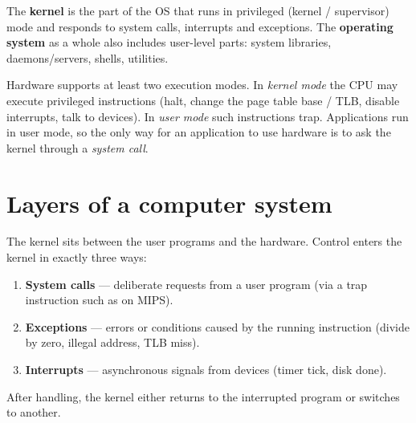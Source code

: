 \begin{definition}[Kernel]
The \textbf{kernel} is the part of the OS that runs in privileged (kernel / supervisor) mode
and responds to system calls, interrupts and exceptions. The \textbf{operating system} as a whole
also includes user-level parts: system libraries, daemons/servers, shells, utilities.
\end{definition}

\begin{important}[Privilege]
Hardware supports at least two execution modes. In \emph{kernel mode} the CPU may execute
privileged instructions (halt, change the page table base / TLB, disable interrupts, talk to
devices). In \emph{user mode} such instructions trap. Applications run in user mode, so the only
way for an application to use hardware is to ask the kernel through a \emph{system call}.
\end{important}

\section{Layers of a computer system}

\begin{center}
\end{center}

The kernel sits between the user programs and the hardware. Control enters the kernel in exactly
three ways:
\begin{enumerate}
  \item \textbf{System calls} --- deliberate requests from a user program (via a trap
    instruction such as  on MIPS).
  \item \textbf{Exceptions} --- errors or conditions caused by the running instruction
    (divide by zero, illegal address, TLB miss).
  \item \textbf{Interrupts} --- asynchronous signals from devices (timer tick, disk done).
\end{enumerate}
After handling, the kernel either returns to the interrupted program or switches to another.

